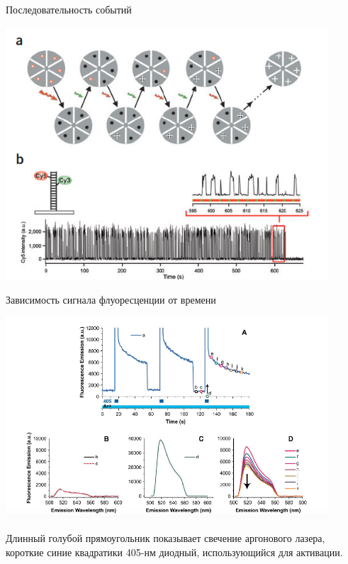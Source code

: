 \documentclass[9pt, compress, xcolor=table]{beamer}
\begin{document}
\begin{frame}{Последовательность событий}
\begin{center}
\includegraphics[width=0.9\textwidth]{lm14}
\end{center}
\end{frame}

\begin{frame}{Зависимость сигнала флуоресценции от времени}
\begin{center}
\includegraphics[width=0.9\textwidth]{lm2}

Длинный голубой прямоугольник показывает свечение аргонового лазера, короткие синие квадратики 405-нм диодный, использующийся для активации.

\end{center}
\end{frame}
\end{document}
